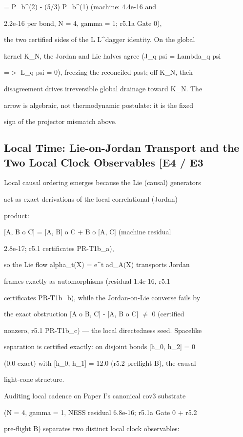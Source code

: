 \documentclass[11pt,a4paper]{article}
\theoremstyle{definition}
\begin{document}
        = P\_b\^{}{(2)} - (5/3) P\_b\^{}{(1)}   (machine: 4.4e-16 and

        2.2e-16 per bond, N = 4, gamma = 1; r5.1a Gate 0),


the two certified sides of the L L\^{}dagger identity. On the global

kernel K\_N, the Jordan and Lie halves agree (J\_q psi = Lambda\_q psi

=$>$ L\_q psi = 0), freezing the reconciled past; off K\_N, their

disagreement drives irreversible global drainage toward K\_N. The

arrow is algebraic, not thermodynamic postulate: it is the fixed

sign of the projector mismatch above.


\subsection{Local Time: Lie-on-Jordan Transport and the Two Local Clock Observables [E4 / E3}

Local causal ordering emerges because the Lie (causal) generators

act as exact derivations of the local correlational (Jordan)

product:


    [A, B o C] = [A, B] o C + B o [A, C]   (machine residual

    2.8e-17; r5.1 certificates PR-T1b\_a),


so the Lie flow alpha\_t(X) = e\^{}{t ad\_A}(X) transports Jordan

frames exactly as automorphisms (residual 1.4e-16, r5.1

certificates PR-T1b\_b), while the Jordan-on-Lie converse fails by

the exact obstruction [A o B, C] - [A, B o C] $\neq$ 0 (certified

nonzero, r5.1 PR-T1b\_c) — the local directedness seed. Spacelike

separation is certified exactly: on disjoint bonds [h\_0, h\_2] = 0

(0.0 exact) with [h\_0, h\_1] = 12.0 (r5.2 preflight B), the causal

light-cone structure.


Auditing local cadence on Paper I's canonical cov3 substrate

(N = 4, gamma = 1, NESS residual 6.8e-16; r5.1a Gate 0 + r5.2

pre-flight B) separates two distinct local clock observables:
\end{document}
